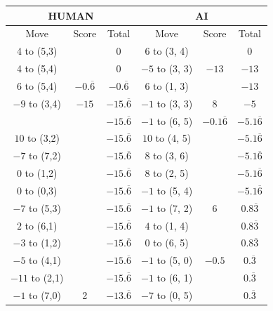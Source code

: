 \begin{appendices}
\begin{table}[H]
    \centering
    \begin{tabular}{cccccc}
        \hline
        \multicolumn{3}{c}{HUMAN}        & \multicolumn{3}{c}{AI}     \\ \hline
        Move         & Score & Total & Move          & Score & Total \\ \hline
          4 to (5,3) &       &  0    &   6 to (3, 4) &       &  0    \\ \hline
          4 to (5,4) &       &  0    &   $-5$ to (3, 3) & $-13$       &  $-13$    \\ \hline
          6 to (5,4) & $-0.\overline6$  &  $-0.\overline6$  & $6$ to (1, 3) &        &  $-13$    \\ \hline
          $-9$ to (3,4) & $-15$  &  $-15.\overline6$  & $-1$ to (3, 3) & $8$        &  $-5$    \\ \hline
                        &        &  $-15.\overline6$  & $-1$ to (6, 5) & $-0.1\overline6$        &  $-5.1\overline6$    \\ \hline
          $10$ to (3,2) &        &  $-15.\overline6$  & $10$ to (4, 5) &            &  $-5.1\overline6$    \\ \hline
          $-7$ to (7,2) &        &  $-15.\overline6$  & $8$ to (3, 6) &            &  $-5.1\overline6$    \\ \hline
          $0$ to (1,2) &          &  $-15.\overline6$  & $8$ to (2, 5) &            &  $-5.1\overline6$    \\ \hline
          $0$ to (0,3) &          &  $-15.\overline6$  & $-1$ to (5, 4) &           &  $-5.1\overline6$    \\ \hline
          $-7$ to (5,3) &          &  $-15.\overline6$  & $-1$ to (7, 2) & $6$           &  $0.8\overline3$    \\ \hline
          $2$ to (6,1) &          &  $-15.\overline6$  & $4$ to (1, 4) &               &  $0.8\overline3$    \\ \hline
          $-3$ to (1,2) &          &  $-15.\overline6$  & $0$ to (6, 5) &               &  $0.8\overline3$    \\ \hline
          $-5$ to (4,1) &          &  $-15.\overline6$  & $-1$ to (5, 0) & $-0.5$       &  $0.\overline3$    \\ \hline
          $-11$ to (2,1) &         &  $-15.\overline6$  & $-1$ to (6, 1) &              &  $0.\overline3$    \\ \hline
          $-1$ to (7,0) & 2        &  $-13.\overline6$  & $-7$ to (0, 5) &              &  $0.\overline3$    \\ \hline

\end{tabular}
\end{table}
\end{appendices}
